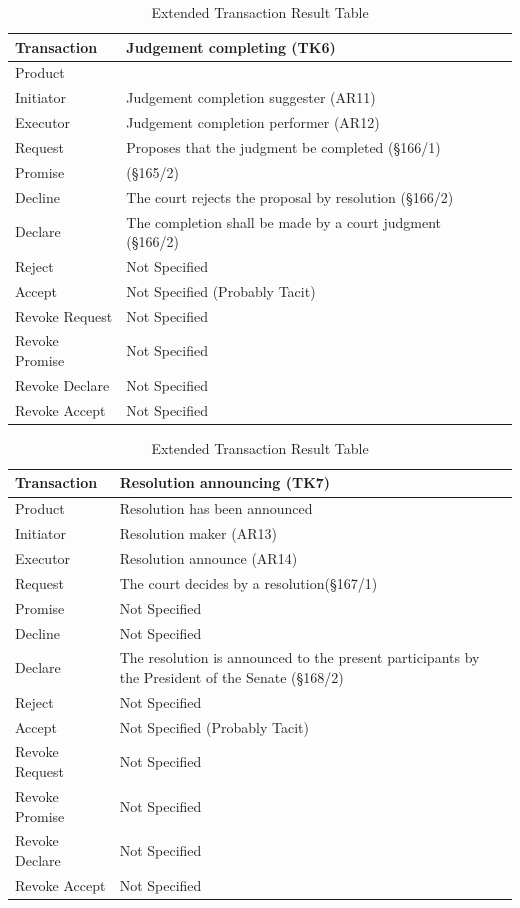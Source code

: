 \begin{landscape}
\begin{table}[h]
\caption{Extended Transaction Result Table}
\label{tab:etrt}
\begin{tabular}{|l||l|l|}
\hline
Transaction  &  Judgement completing (TK6) \\ \hline
Product      &   \\ \hline
Initiator      & Judgement completion suggester (AR11)  \\ \hline
Executor       &  Judgement completion performer (AR12) \\ \hline
Request        & Proposes that the judgment be completed (\S166/1)  \\ \hline
Promise        &   (\S165/2)    \\ \hline
Decline        &  The court rejects the proposal by resolution (\S166/2) \\ \hline
Declare        &  The completion shall be made by a court judgment (\S166/2)  \\ \hline
Reject         &  Not Specified   \\ \hline
Accept         & Not Specified (Probably Tacit) \\ \hline
Revoke Request & Not Specified       \\ \hline
Revoke Promise & Not Specified  \\ \hline
Revoke Declare & Not Specified      \\ \hline
Revoke Accept  &  Not Specified \\ \hline
\end{tabular}
\end{table}

\begin{table}[h]
\caption{Extended Transaction Result Table}
\label{tab:etrt}
\begin{tabular}{|l||l|l|}
\hline
Transaction  &  Resolution announcing (TK7) \\ \hline
Product      &   Resolution has been announced \\ \hline
Initiator      &  Resolution maker (AR13) \\ \hline
Executor       &  Resolution announce (AR14) \\ \hline
Request        &  The court decides by a resolution(\S167/1)  \\ \hline
Promise        &  Not Specified   \\ \hline
Decline        &  Not Specified   \\ \hline
Declare        &  The resolution is announced to the present participants by the President of the Senate (\S168/2)  \\ \hline
Reject         &  Not Specified   \\ \hline
Accept         & Not Specified (Probably Tacit) \\ \hline
Revoke Request & Not Specified       \\ \hline
Revoke Promise & Not Specified  \\ \hline
Revoke Declare & Not Specified      \\ \hline
Revoke Accept  &  Not Specified \\ \hline
\end{tabular}
\end{table}


\end{landscape}
